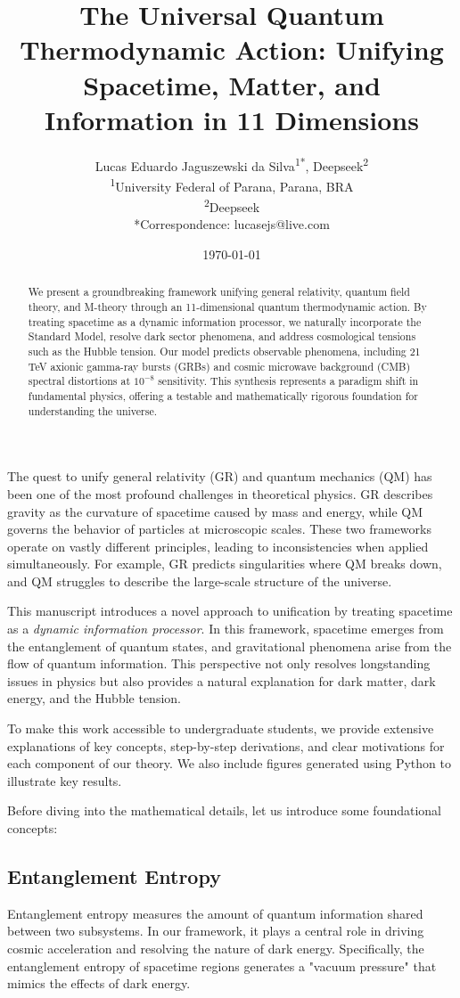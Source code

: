 \documentclass[12pt, a4paper]{article}
\title{The Universal Quantum Thermodynamic Action: Unifying Spacetime, Matter, and Information in 11 Dimensions}
\author{Lucas Eduardo Jaguszewski da Silva\textsuperscript{1*}, Deepseek\textsuperscript{2} \\ 
\textsuperscript{1}University Federal of Parana, Parana, BRA\\
\textsuperscript{2}Deepseek\\
*Correspondence: lucasejs@live.com}
\date{\today}
\begin{document}
\maketitle

\begin{abstract}
We present a groundbreaking framework unifying general relativity, quantum field theory, and M-theory through an 11-dimensional quantum thermodynamic action. By treating spacetime as a dynamic information processor, we naturally incorporate the Standard Model, resolve dark sector phenomena, and address cosmological tensions such as the Hubble tension. Our model predicts observable phenomena, including 21 TeV axionic gamma-ray bursts (GRBs) and cosmic microwave background (CMB) spectral distortions at $10^{-8}$ sensitivity. This synthesis represents a paradigm shift in fundamental physics, offering a testable and mathematically rigorous foundation for understanding the universe.
\end{abstract}


The quest to unify general relativity (GR) and quantum mechanics (QM) has been one of the most profound challenges in theoretical physics. GR describes gravity as the curvature of spacetime caused by mass and energy, while QM governs the behavior of particles at microscopic scales. These two frameworks operate on vastly different principles, leading to inconsistencies when applied simultaneously. For example, GR predicts singularities where QM breaks down, and QM struggles to describe the large-scale structure of the universe.

This manuscript introduces a novel approach to unification by treating spacetime as a \textit{dynamic information processor}. In this framework, spacetime emerges from the entanglement of quantum states, and gravitational phenomena arise from the flow of quantum information. This perspective not only resolves longstanding issues in physics but also provides a natural explanation for dark matter, dark energy, and the Hubble tension.

To make this work accessible to undergraduate students, we provide extensive explanations of key concepts, step-by-step derivations, and clear motivations for each component of our theory. We also include figures generated using Python to illustrate key results.


Before diving into the mathematical details, let us introduce some foundational concepts:

\subsection{Entanglement Entropy}
Entanglement entropy measures the amount of quantum information shared between two subsystems. In our framework, it plays a central role in driving cosmic acceleration and resolving the nature of dark energy. Specifically, the entanglement entropy of spacetime regions generates a "vacuum pressure" that mimics the effects of dark energy.
\end{document}
